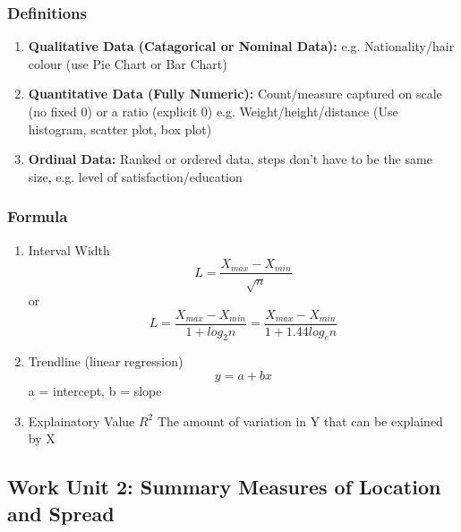 \documentclass[a4paper,10pt]{article}
\begin{document}
\subsubsection{Definitions}
\begin{enumerate}
	\item \textbf{Qualitative Data (Catagorical or Nominal Data):} e.g. Nationality/hair colour (use Pie Chart or Bar Chart)
	\item \textbf{Quantitative Data (Fully Numeric):} Count/measure captured on scale (no fixed 0) or a ratio (explicit 0) e.g. Weight/height/distance (Use histogram, scatter plot, box plot)
	\item \textbf{Ordinal Data:} Ranked or ordered data, steps don't have to be the same size, e.g. level of satisfaction/education
\end{enumerate}
\subsubsection{Formula}
\begin{enumerate}
	\item Interval Width \[ L= \frac{X_{max}-X_{min}}{\sqrt{n}}\] or \[L = \frac{X_{max}-X_{min}}{1+log_2n} = \frac{X_{max}-X_{min}}{1+1.44log_en}\]
	\item Trendline (linear regression) \[y=a+bx\] a = intercept, b = slope
	\item Explainatory Value $R^2$ The amount of variation in Y that can be explained by X	
\end{enumerate}

\subsection{Work Unit 2: Summary Measures of Location and Spread}
\end{document}

